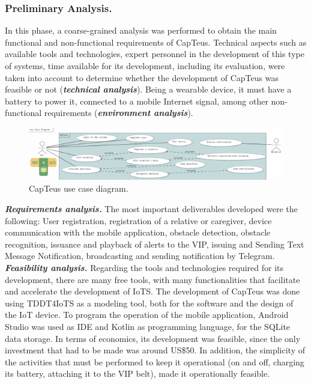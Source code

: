 \documentclass{svproc}
\begin{document}
\subsubsection{Preliminary Analysis.} In this phase, a coarse-grained analysis was performed
to obtain the main functional and non-functional requirements of CapTeus. Technical
aspects such as available tools and technologies, expert personnel in the
development of this type of systems, time available for its development, including
its evaluation, were taken into account to determine whether the development
of CapTeus was feasible or not (\textit{\textbf{technical analysis}}). Being a wearable device, it must have a battery to power it, connected to a mobile Internet signal, among other non-functional requirements (\textit{\textbf{environment analysis}}).

\begin{figure}[h!]
	\includegraphics[scale=1.25]{fig1.pdf}
	\centering
	\caption{CapTeus use case diagram.}
	\label{fig:fig1}
\end{figure}

\noindent
\textbf{\textit{Requirements analysis.}} The most important deliverables developed were the following:
User registration, registration of a relative or caregiver, device communication
with the mobile application, obstacle detection, obstacle recognition,
issuance and playback of alerts to the VIP, issuing and Sending Text Message
Notification, broadcasting and sending notification by Telegram.\\

\noindent
\textbf{\textit{Feasibility analysis.}} Regarding the tools and technologies required for its development, there are
many free tools, with many functionalities that facilitate and accelerate the
development of IoTS. The development of CapTeus was done using TDDT4IoTS
as a modeling tool, both for the software and the design of the IoT device. To
program the operation of the mobile application, Android Studio was used as
IDE and Kotlin as programming language, for the SQLite data storage. In terms of economics, its development was feasible, since the only investment
that had to be made was around US\$50. In addition, the simplicity of the activities
that must be performed to keep it operational (on and off, charging its battery,
attaching it to the VIP belt), made it operationally feasible.
\end{document}
